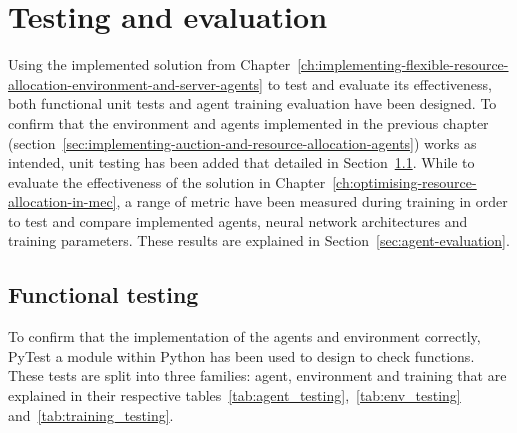 
\chapter{Testing and evaluation}\label{ch:testing-and-evaluation}
Using the implemented solution from
Chapter~\ref{ch:implementing-flexible-resource-allocation-environment-and-server-agents} to test and evaluate its
effectiveness, both functional unit tests and agent training evaluation have been designed. To confirm that the
environment and agents implemented in the previous chapter
(section~\ref{sec:implementing-auction-and-resource-allocation-agents}) works as intended, unit testing has been added
that detailed in Section~\ref{sec:functional-testing}. While to evaluate the effectiveness of the solution
in Chapter~\ref{ch:optimising-resource-allocation-in-mec}, a range of metric have been measured during training in
order to test and compare implemented agents, neural network architectures and training parameters. These results are
explained in Section~\ref{sec:agent-evaluation}.

\section{Functional testing}\label{sec:functional-testing}
To confirm that the implementation of the agents and environment correctly, PyTest a module within Python has been used
to design to check functions. These tests are split into three families: agent, environment and training that are
explained in their respective tables~\ref{tab:agent_testing},~\ref{tab:env_testing} and~\ref{tab:training_testing}.

